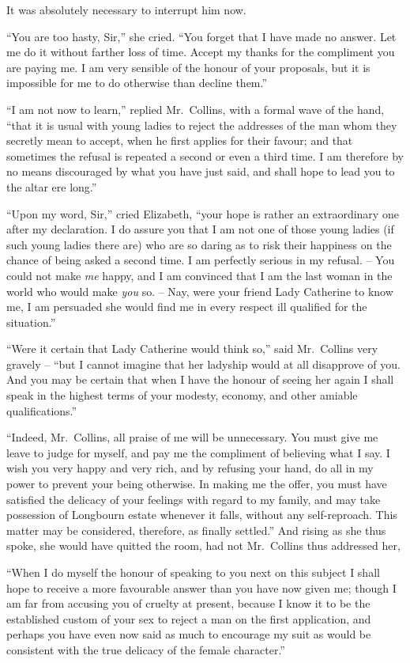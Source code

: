 It was absolutely necessary to interrupt him now.

“You are too hasty, Sir,” she cried. “You forget that
I have made no answer. Let me do it without farther
loss of time. Accept my thanks for the compliment you
are paying me. I am very sensible of the honour of your
proposals, but it is impossible for me to do otherwise
than decline them.”

“I am not now to learn,” replied Mr.\ Collins, with
a formal wave of the hand, “that it is usual with young
ladies to reject the addresses of the man whom they
secretly mean to accept, when he first applies for their
favour; and that sometimes the refusal is repeated a
second or even a third time. I am therefore by no means
discouraged by what you have just said, and shall hope
to lead you to the altar ere long.”

“Upon my word, Sir,” cried Elizabeth, “your hope is
rather an extraordinary one after my declaration. I do
assure you that I am not one of those young ladies (if such
young ladies there are) who are so daring as to risk their
happiness on the chance of being asked a second time.
I am perfectly serious in my refusal. -- You could not
make \textit{me} happy, and I am convinced that I am the last
woman in the world who would make \textit{you} so. -- Nay, were
your friend Lady Catherine to know me, I am persuaded
she would find me in every respect ill qualified for the
situation.”

“Were it certain that Lady Catherine would think so,”
said Mr.\ Collins very gravely -- “but I cannot imagine
that her ladyship would at all disapprove of you. And
you may be certain that when I have the honour of seeing
her again I shall speak in the highest terms of your
modesty, economy, and other amiable qualifications.”

“Indeed, Mr.\ Collins, all praise of me will be unnecessary.
You must give me leave to judge for myself, and
pay me the compliment of believing what I say. I wish
you very happy and very rich, and by refusing your hand,
do all in my power to prevent your being otherwise. In
making me the offer, you must have satisfied the delicacy
of your feelings with regard to my family, and may take
possession of Longbourn estate whenever it falls, without
any self-reproach. This matter may be considered,
therefore, as finally settled.” And rising as she thus spoke, she
would have quitted the room, had not Mr.\ Collins thus
addressed her,

“When I do myself the honour of speaking to you
next on this subject I shall hope to receive a more favourable
answer than you have now given me; though I am
far from accusing you of cruelty at present, because
I know it to be the established custom of your sex to reject
a man on the first application, and perhaps you have even
now said as much to encourage my suit as would be consistent
with the true delicacy of the female character.”


